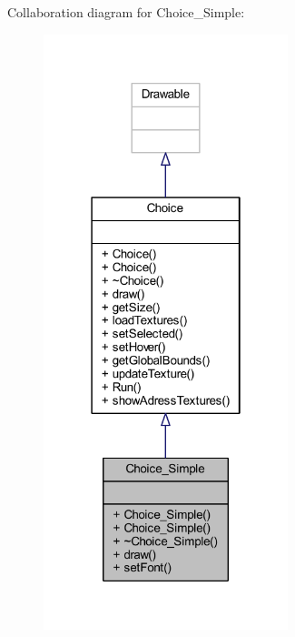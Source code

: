 Collaboration diagram for Choice\+\_\+\+Simple\+:
\nopagebreak
\begin{figure}[H]
\begin{center}
\leavevmode
\includegraphics[width=202pt]{class_choice___simple__coll__graph}
\end{center}
\end{figure}
